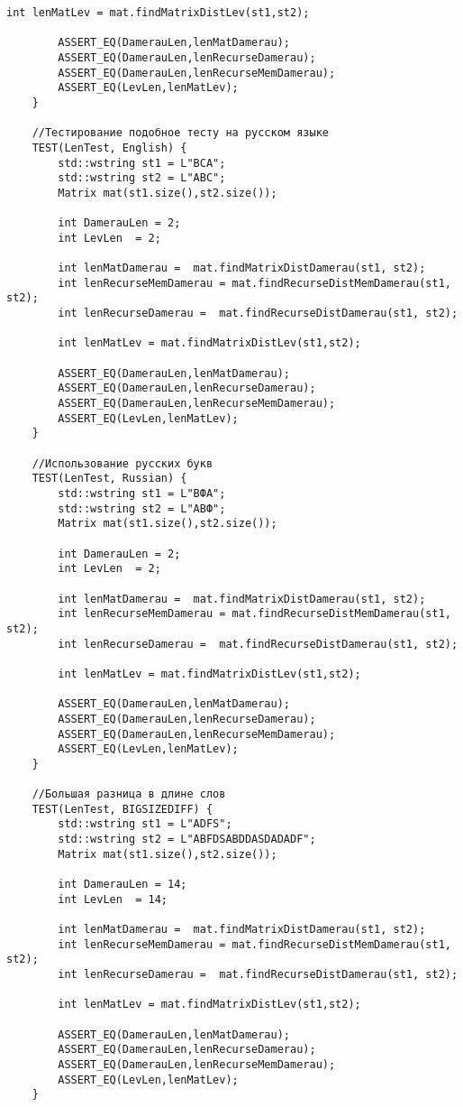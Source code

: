 \begin{lstlisting}[label=lst:unit_tests, caption=Модульные тесты]
        int lenMatLev = mat.findMatrixDistLev(st1,st2);
    
        ASSERT_EQ(DamerauLen,lenMatDamerau);
        ASSERT_EQ(DamerauLen,lenRecurseDamerau);
        ASSERT_EQ(DamerauLen,lenRecurseMemDamerau);
        ASSERT_EQ(LevLen,lenMatLev);
    }
    
    //Тестирование подобное тесту на русском языке
    TEST(LenTest, English) {
        std::wstring st1 = L"BCA";
        std::wstring st2 = L"ABC";
        Matrix mat(st1.size(),st2.size());
    
        int DamerauLen = 2;
        int LevLen  = 2;
    
        int lenMatDamerau =  mat.findMatrixDistDamerau(st1, st2);
        int lenRecurseMemDamerau = mat.findRecurseDistMemDamerau(st1, st2);
        int lenRecurseDamerau =  mat.findRecurseDistDamerau(st1, st2);
    
        int lenMatLev = mat.findMatrixDistLev(st1,st2);
    
        ASSERT_EQ(DamerauLen,lenMatDamerau);
        ASSERT_EQ(DamerauLen,lenRecurseDamerau);
        ASSERT_EQ(DamerauLen,lenRecurseMemDamerau);
        ASSERT_EQ(LevLen,lenMatLev);
    }
    
    //Использование русских букв
    TEST(LenTest, Russian) {
        std::wstring st1 = L"ВФА";
        std::wstring st2 = L"АВФ";
        Matrix mat(st1.size(),st2.size());
    
        int DamerauLen = 2;
        int LevLen  = 2;
    
        int lenMatDamerau =  mat.findMatrixDistDamerau(st1, st2);
        int lenRecurseMemDamerau = mat.findRecurseDistMemDamerau(st1, st2);
        int lenRecurseDamerau =  mat.findRecurseDistDamerau(st1, st2);
    
        int lenMatLev = mat.findMatrixDistLev(st1,st2);
    
        ASSERT_EQ(DamerauLen,lenMatDamerau);
        ASSERT_EQ(DamerauLen,lenRecurseDamerau);
        ASSERT_EQ(DamerauLen,lenRecurseMemDamerau);
        ASSERT_EQ(LevLen,lenMatLev);
    }
    
    //Большая разница в длине слов
    TEST(LenTest, BIGSIZEDIFF) {
        std::wstring st1 = L"ADFS";
        std::wstring st2 = L"ABFDSABDDASDADADF";
        Matrix mat(st1.size(),st2.size());
    
        int DamerauLen = 14;
        int LevLen  = 14;
    
        int lenMatDamerau =  mat.findMatrixDistDamerau(st1, st2);
        int lenRecurseMemDamerau = mat.findRecurseDistMemDamerau(st1, st2);
        int lenRecurseDamerau =  mat.findRecurseDistDamerau(st1, st2);
    
        int lenMatLev = mat.findMatrixDistLev(st1,st2);
    
        ASSERT_EQ(DamerauLen,lenMatDamerau);
        ASSERT_EQ(DamerauLen,lenRecurseDamerau);
        ASSERT_EQ(DamerauLen,lenRecurseMemDamerau);
        ASSERT_EQ(LevLen,lenMatLev);
    }
\end{lstlisting}

